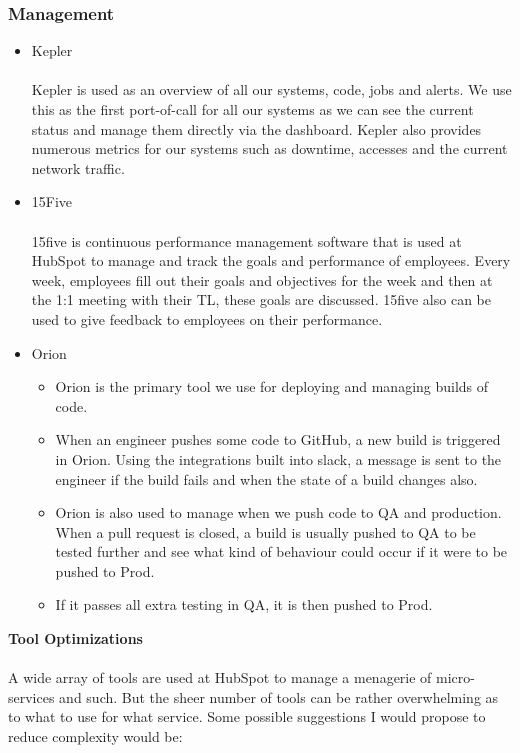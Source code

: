 \documentclass[12pt]{article} %
\begin{document}
\subsubsection{\textbf{Management}}
\begin{itemize}
\item Kepler \\\\
Kepler is used as an overview of all our systems,  code,  jobs and alerts.  We use this as the first port-of-call for all our systems as we can see the current status and manage them directly via the dashboard.  Kepler also provides numerous metrics for our systems such as downtime, accesses and the current network traffic.
\item 15Five \\\\
15five is continuous performance management software that is used at HubSpot to manage and track the goals and performance of employees. Every week, employees fill out their goals and objectives for the week and then at the 1:1 meeting with their TL, these goals are discussed.  15five also can be used to give feedback to employees on their performance.
\item Orion
\begin{itemize}
\item Orion is the primary tool we use for deploying and managing builds of code. 
\item When an engineer pushes some code to GitHub,  a new build is triggered in Orion.  Using the integrations built into slack,  a message is sent to the engineer if the build fails and when the state of a build changes also.
\item Orion is also used to manage when we push code to QA and production.  When a pull request is closed,  a build is usually pushed to QA to be tested further and see what kind of behaviour could occur if it were to be pushed to Prod. 
\item If it passes all extra testing in QA,  it is then pushed to Prod. 
\end{itemize}
\end{itemize}
\textbf{Tool Optimizations} \\\\
A wide array of tools are used at HubSpot to manage a menagerie of micro-services and such. But the sheer number of tools can be rather overwhelming as to what to use for what service. Some possible suggestions I would propose to reduce complexity would be: 
\end{document}
